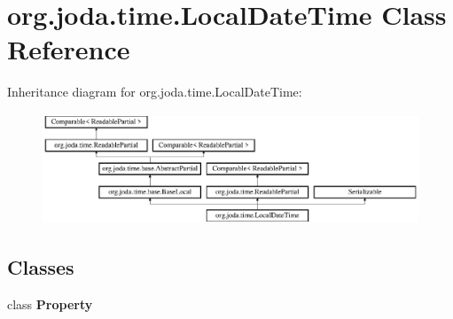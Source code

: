 \hypertarget{classorg_1_1joda_1_1time_1_1_local_date_time}{\section{org.\-joda.\-time.\-Local\-Date\-Time Class Reference}
\label{classorg_1_1joda_1_1time_1_1_local_date_time}
}
Inheritance diagram for org.\-joda.\-time.\-Local\-Date\-Time\-:\begin{figure}[H]
\begin{center}
\leavevmode
\includegraphics[height=3.317535cm]{classorg_1_1joda_1_1time_1_1_local_date_time}
\end{center}
\end{figure}
\subsection*{Classes}
\begin{DoxyCompactItemize}
\item 
class {\bfseries Property}
\end{DoxyCompactItemize}
